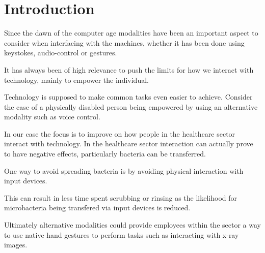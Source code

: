 \section{Introduction}
Since the dawn of the computer age modalities have been an important aspect
to consider when interfacing with the machines, whether it has been done using keystokes, audio-control or gestures.

It has always been of high relevance to push the limits for how we interact with technology, mainly to empower the individual.

Technology is supposed to make common tasks even easier to achieve. Consider the case of a physically disabled person being empowered by using an alternative modality such as voice control.

In our case the focus is to improve on how people in the healthcare sector interact with technology.
In the healthcare sector interaction can actually prove to have negative effects, particularly bacteria can be transferred.

One way to avoid spreading bacteria is by avoiding physical interaction with input devices.

This can result in less time spent scrubbing or rinsing as the likelihood for microbacteria being 
transfered via input devices is reduced.

Ultimately alternative modalities could provide employees within the sector a 
way to use native hand gestures to perform tasks such as interacting with x-ray images.
